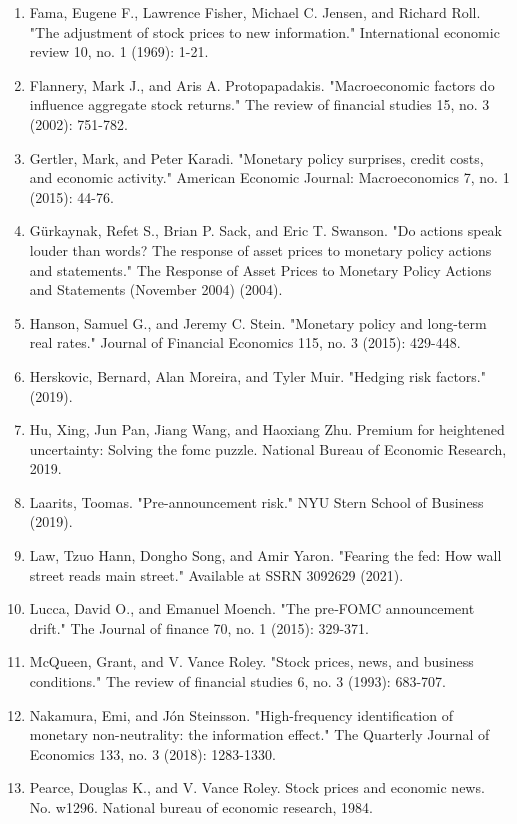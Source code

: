 \documentclass[12pt]{article}
\begin{document}
\begin{enumerate}
    \item{Fama, Eugene F., Lawrence Fisher, Michael C. Jensen, and Richard Roll. "The adjustment of stock prices to new information." International economic review 10, no. 1 (1969): 1-21.}
    \item{Flannery, Mark J., and Aris A. Protopapadakis. "Macroeconomic factors do influence aggregate stock returns." The review of financial studies 15, no. 3 (2002): 751-782.}
    \item{Gertler, Mark, and Peter Karadi. "Monetary policy surprises, credit costs, and economic activity." American Economic Journal: Macroeconomics 7, no. 1 (2015): 44-76.}
    \item{Gürkaynak, Refet S., Brian P. Sack, and Eric T. Swanson. "Do actions speak louder than words? The response of asset prices to monetary policy actions and statements." The Response of Asset Prices to Monetary Policy Actions and Statements (November 2004) (2004).}
    \item{Hanson, Samuel G., and Jeremy C. Stein. "Monetary policy and long-term real rates." Journal of Financial Economics 115, no. 3 (2015): 429-448.}
    \item{Herskovic, Bernard, Alan Moreira, and Tyler Muir. "Hedging risk factors." (2019).}
    \item{Hu, Xing, Jun Pan, Jiang Wang, and Haoxiang Zhu. Premium for heightened uncertainty: Solving the fomc puzzle. National Bureau of Economic Research, 2019.}
    \item{Laarits, Toomas. "Pre-announcement risk." NYU Stern School of Business (2019).}
    \item{Law, Tzuo Hann, Dongho Song, and Amir Yaron. "Fearing the fed: How wall street reads main street." Available at SSRN 3092629 (2021).}
    \item{Lucca, David O., and Emanuel Moench. "The pre‐FOMC announcement drift." The Journal of finance 70, no. 1 (2015): 329-371.}
    \item{McQueen, Grant, and V. Vance Roley. "Stock prices, news, and business conditions." The review of financial studies 6, no. 3 (1993): 683-707.}
    \item{Nakamura, Emi, and Jón Steinsson. "High-frequency identification of monetary non-neutrality: the information effect." The Quarterly Journal of Economics 133, no. 3 (2018): 1283-1330.}
    \item{Pearce, Douglas K., and V. Vance Roley. Stock prices and economic news. No. w1296. National bureau of economic research, 1984.}

\end{enumerate}
\end{document}
